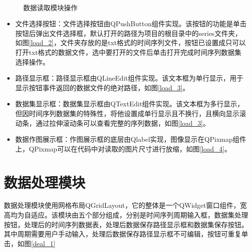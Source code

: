 \documentclass[cn,11pt,chinese]{elegantbook}
\begin{document}
\begin{figure}
{	}\\
	\caption{数据读取模块操作}
	\label{load}
\end{figure}

\begin{itemize}
	\item 文件选择按钮：文件选择按钮由QPushButton组件实现。该按钮的功能是单击按钮后弹出文件选择框，默认打开的路径为项目的根目录中的series文件夹，如图\ref{load_2}，文件夹存放的是txt格式的时间序列文件，按钮已设置成只可以打开txt格式的数据文件，选中要打开的文件后单击打开完成时间序列数据集选择操作。
	\item 路径显示框：路径显示框由QLineEdit组件实现。该文本框为单行显示，用于显示按钮事件返回的数据文件的绝对路径，如图\ref{load_3}。
	\item 数据集显示框：数据集显示框由QTextEdit组件实现。该文本框为多行显示，但因时间序列数据集的特殊性，将他设置成单行显示且不换行，且横向显示滚动条，通过拉伸滚动条可以查看完整的序列数据，如图\ref{load_3}。
	\item 数据作图展示框：作图展示框的底层由Qlabel实现，图像显示在QPixmap组件上，QPixmap可以在代码中对读取的图片尺寸进行放缩，如图\ref{load_4}。
\end{itemize}

\section{数据处理模块}

数据处理模块使用网格布局QGridLayout，它的整体是一个QWidget窗口组件，宽高均为自适应。该模块由五个部分组成，分别是时间序列周期输入框，数据集处理按钮，处理后的时间序列数据表，处理后数据保存路径显示框和数据集保存按钮。其中周期需要用户手动输入，处理后数据保存路径显示框不可编辑，按钮可重复单击，如图\ref{deal_1}
\end{document}
